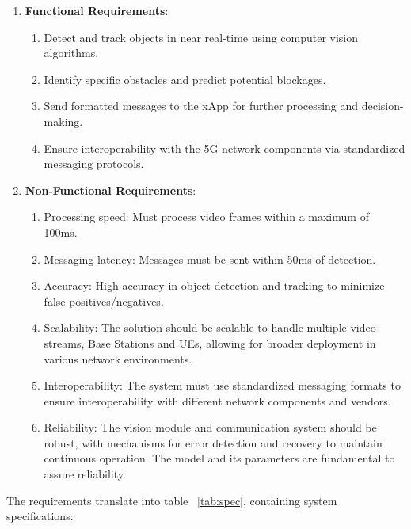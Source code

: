 \begin{enumerate}
    \item \textbf{Functional Requirements}:
    \begin{enumerate}
        \item Detect and track objects in near real-time using computer vision algorithms.
        \item Identify specific obstacles and predict potential blockages.
        \item Send formatted messages to the xApp for further processing and decision-making.
        \item Ensure interoperability with the 5G network components via standardized messaging protocols. %
    \end{enumerate}
    \item \textbf{Non-Functional Requirements}:
    \begin{enumerate}
        \item Processing speed: Must process video frames within a maximum of 100ms.
        \item Messaging latency: Messages must be sent within 50ms of detection.
        \item Accuracy: High accuracy in object detection and tracking to minimize false positives/negatives.
        \item Scalability: The solution should be scalable to handle multiple video streams, Base Stations and UEs, allowing for broader deployment in various network environments.
        \item Interoperability: The system must use standardized messaging formats to ensure interoperability with different network components and vendors.
        \item Reliability: The vision module and communication system should be robust, with mechanisms for error detection and recovery to maintain continuous operation. The model and its parameters are fundamental to assure reliability. %
    \end{enumerate}
\end{enumerate}


The requirements translate into table ~\ref{tab:spec}, containing system specifications:

